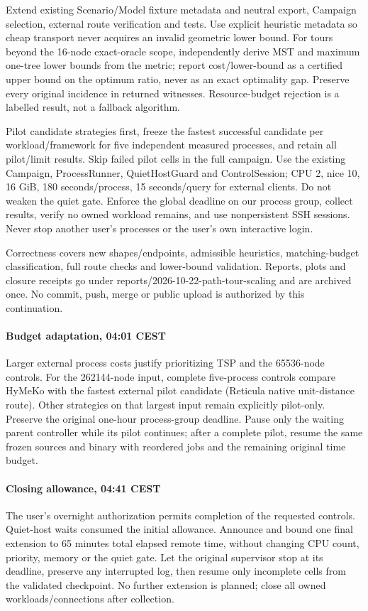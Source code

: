 \documentclass[10pt]{article}
\begin{document}
Extend existing Scenario/Model fixture metadata and neutral export, Campaign selection, external route verification and tests. Use explicit heuristic metadata so cheap transport never acquires an invalid geometric lower bound. For tours beyond the 16-node exact-oracle scope, independently derive MST and maximum one-tree lower bounds from the metric; report cost/lower-bound as a certified upper bound on the optimum ratio, never as an exact optimality gap. Preserve every original incidence in returned witnesses. Resource-budget rejection is a labelled result, not a fallback algorithm.

Pilot candidate strategies first, freeze the fastest successful candidate per workload/framework for five independent measured processes, and retain all pilot/limit results. Skip failed pilot cells in the full campaign. Use the existing Campaign, ProcessRunner, QuietHostGuard and ControlSession; CPU 2, nice 10, 16 GiB, 180 seconds/process, 15 seconds/query for external clients. Do not weaken the quiet gate. Enforce the global deadline on our process group, collect results, verify no owned workload remains, and use nonpersistent SSH sessions. Never stop another user's processes or the user's own interactive login.

Correctness covers new shapes/endpoints, admissible heuristics, matching-budget classification, full route checks and lower-bound validation. Reports, plots and closure receipts go under reports/2026-10-22-path-tour-scaling and are archived once. No commit, push, merge or public upload is authorized by this continuation.
\paragraph{Budget adaptation, 04:01 CEST} Larger external process costs justify prioritizing TSP and the 65536-node controls. For the 262144-node input, complete five-process controls compare HyMeKo with the fastest external pilot candidate (Reticula native unit-distance route). Other strategies on that largest input remain explicitly pilot-only. Preserve the original one-hour process-group deadline. Pause only the waiting parent controller while its pilot continues; after a complete pilot, resume the same frozen sources and binary with reordered jobs and the remaining original time budget.
\paragraph{Closing allowance, 04:41 CEST} The user's overnight authorization permits completion of the requested controls. Quiet-host waits consumed the initial allowance. Announce and bound one final extension to 65 minutes total elapsed remote time, without changing CPU count, priority, memory or the quiet gate. Let the original supervisor stop at its deadline, preserve any interrupted log, then resume only incomplete cells from the validated checkpoint. No further extension is planned; close all owned workloads/connections after collection.
\end{document}
